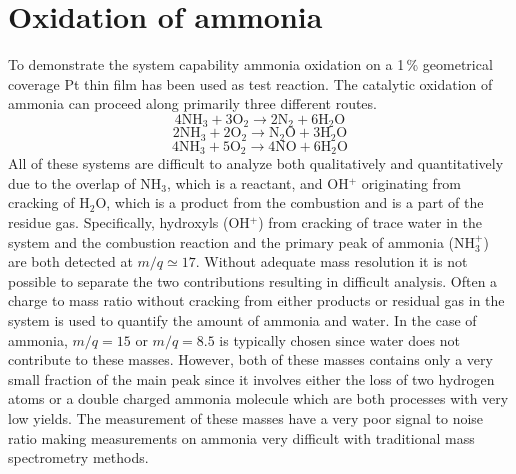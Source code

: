 \documentclass[aip,rsi]{revtex4-1}
\begin{document}
\section{Oxidation of ammonia}
To demonstrate the system capability ammonia oxidation on a 1\,\% geometrical coverage Pt thin film has been used as test reaction. The catalytic oxidation of ammonia can proceed along primarily three different routes\cite{Imbihl2007}.
\begin{equation}
4\mathrm{NH}_3+3\mathrm{O}_2\rightarrow 2\mathrm{N}_2 + 6\mathrm{H}_2\mathrm{O}
\label{eq:Pt_clean_combustion}
\end{equation}
\begin{equation}
2\mathrm{NH}_3+2\mathrm{O}_2\rightarrow \mathrm{N}_2\mathrm{O} + 3\mathrm{H}_2\mathrm{O}
\end{equation}
\begin{equation}
4\mathrm{NH}_3+5\mathrm{O}_2\rightarrow 4\mathrm{NO} + 6\mathrm{H}_2\mathrm{O}
\end{equation}
All of these systems are difficult to analyze both qualitatively and quantitatively due to the overlap of NH$_3$, which is a reactant, and OH$^+$ originating from cracking of H$_2$O, which is a product from the combustion and is a part of the residue gas. Specifically, hydroxyls (OH$^{+}$) from cracking of trace water in the system and the combustion reaction and the primary peak of ammonia (NH$_{3}^{+}$) are both detected at $m/q\simeq17$. Without adequate mass resolution it is not possible to separate the two contributions resulting in difficult analysis. Often a charge to mass ratio without cracking from either products or residual gas in the system is used to quantify the amount of ammonia and water. In the case of ammonia, $m/q=15$ or $m/q=8.5$ is typically chosen since water does not contribute to these masses. However, both of these masses contains only a very small fraction of the main peak since it involves either the loss of two hydrogen atoms or a double charged ammonia molecule which are both processes with very low yields. The measurement of these masses have a very poor signal to noise ratio making measurements on ammonia very difficult with traditional mass spectrometry methods.
\end{document}
